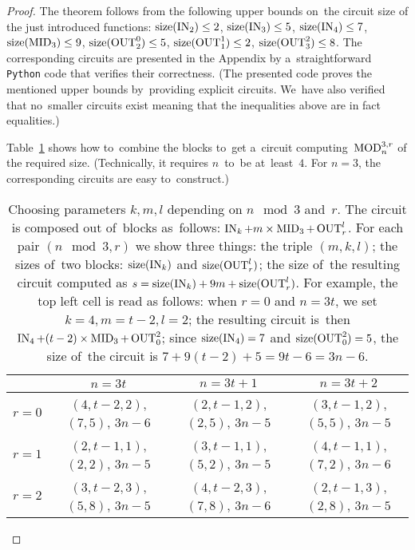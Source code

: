 \begin{proof}
The theorem follows from the following upper bounds
on~the circuit size of the just introduced functions:
$\operatorname{size}(\operatorname{IN}_2) \le 2$,
$\operatorname{size}(\operatorname{IN}_3) \le 5$,
$\operatorname{size}(\operatorname{IN}_4) \le 7$,
$\operatorname{size}(\operatorname{MID}_3) \le 9$,
$\operatorname{size}(\operatorname{OUT}_2^0) \le 5$,
$\operatorname{size}(\operatorname{OUT}_1^1) \le 2$,
$\operatorname{size}(\operatorname{OUT}_3^2) \le 8$.
The corresponding circuits are presented in the Appendix
by a~straightforward \texttt{Python} code that verifies their correctness. (The presented code proves the mentioned upper bounds by~providing explicit circuits. We~have also verified that no~smaller circuits exist meaning that the
inequalities above are in fact equalities.)

Table~\ref{table:parameters} shows how to~combine
the blocks
to~get a~circuit computing~$\operatorname{MOD}_n^{3,r}$ of the required size. (Technically, it requires $n$~to~be at~least~$4$. For $n=3$, the corresponding circuits are easy to~construct.)

\begin{table}
\begin{center}
\begin{tabular}{cccc}
\toprule
& $n=3t$ & $n=3t+1$ & $n=3t+2$\\
\midrule
$r=0$
& $(4, t-2, 2)$, $(7, 5)$, $3n-6$
& $(2, t-1, 2)$, $(2, 5)$, $3n-5$
& $(3, t-1, 2)$, $(5, 5)$, $3n-5$
\\
$r=1$
& $(2, t-1, 1)$, $(2, 2)$, $3n-5$
& $(3, t-1, 1)$, $(5, 2)$, $3n-5$
& $(4, t-1, 1)$, $(7, 2)$, $3n-6$
\\
$r=2$
& $(3, t-2, 3)$, $(5, 8)$, $3n-5$
& $(4, t-2, 3)$, $(7, 8)$, $3n-6$
& $(2, t-1, 3)$, $(2, 8)$, $3n-5$
\\
\bottomrule
\end{tabular}
\end{center}
\caption{Choosing parameters $k, m, l$ depending on $n \mod 3$ and~$r$. The circuit is composed out of~blocks
as~follows: $\operatorname{IN}_k + m \times \operatorname{MID}_3 + \operatorname{OUT}_r^l$. For each
pair $(n \mod 3, r)$ we show three things: the triple
$(m, k, l)$; the sizes of~two blocks: $\operatorname{size}(\operatorname{IN}_k)$ and $\operatorname{size}(\operatorname{OUT}_r^l)$; the size of~the resulting circuit
computed as $s=\operatorname{size}(\operatorname{IN}_k)+9m+\operatorname{size}(\operatorname{OUT}_r^l)$. For example, the top left cell is read as follows: when $r=0$ and $n=3t$, we set $k=4,m=t-2,l=2$; the resulting circuit 
is~then $\operatorname{IN}_4 + (t-2) \times \operatorname{MID}_3 + \operatorname{OUT}_0^2$; since $\operatorname{size}(\operatorname{IN}_4)=7$ and $\operatorname{size}(\operatorname{OUT}_0^2)=5$, the size of~the circuit is $7+9(t-2)+5=9t-6=3n-6$.}
\label{table:parameters}
\end{table}
\end{proof}

